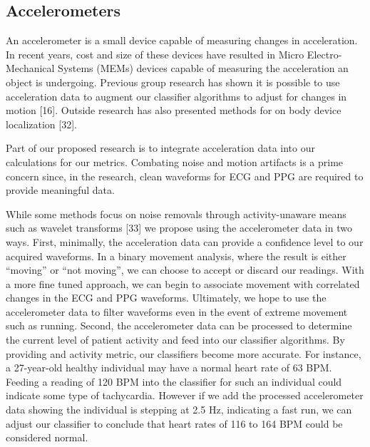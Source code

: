 \subsection{Accelerometers}
An accelerometer is a small device capable of measuring changes in acceleration. In recent years, cost and size of these devices have resulted in Micro Electro-Mechanical Systems (MEMs) devices capable of measuring the acceleration an object is undergoing. Previous group research has shown it is possible to use acceleration data to augment our classifier algorithms to adjust for changes in motion [16].  Outside research has also presented methods for on body device localization [32]. 

Part of our proposed research is to integrate acceleration data into our calculations for our metrics. Combating noise  and motion artifacts is a prime concern since, in the research, clean waveforms for ECG and PPG are required to provide meaningful data.

While some methods focus on noise removals through activity-unaware means such as wavelet transforms [33] we propose using the accelerometer data in two ways. First, minimally, the acceleration data can provide a confidence level to our acquired waveforms. In a binary movement analysis, where the result is either “moving” or “not moving”, we can choose to accept or discard our readings. With a more fine tuned approach, we can begin to associate movement with correlated changes in the ECG and PPG waveforms. Ultimately, we hope to use the accelerometer data to filter waveforms even in the event of extreme movement such as running. Second, the accelerometer data can be processed to determine the current level of patient activity and feed into our classifier algorithms. By providing and activity metric, our classifiers become more accurate. For instance, a 27-year-old healthy individual may have a normal heart rate of 63 BPM. Feeding a reading of 120 BPM into the classifier for such an individual could indicate some type of tachycardia. However if we add the processed accelerometer data showing the individual is stepping at 2.5 Hz, indicating a fast run, we can adjust our classifier to conclude that heart rates of 116 to 164 BPM could be considered normal.

